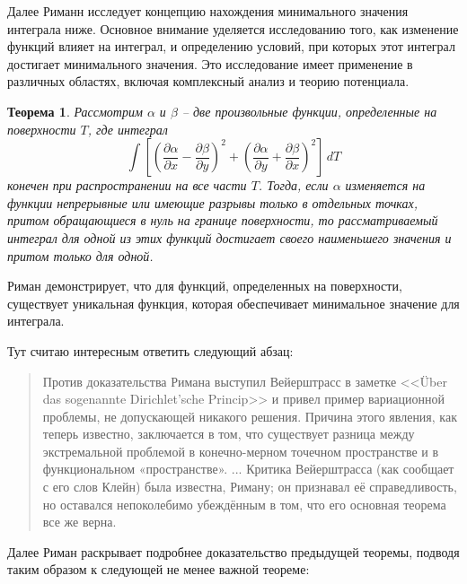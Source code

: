 \documentclass[a4paper,12pt]{article}
\newtheorem*{theorem}{Теорема}
\theoremstyle{remark}
\begin{document}
Далее Риманн исследует концепцию нахождения минимального значения интеграла ниже.
Основное внимание уделяется исследованию того, как изменение
функций влияет на интеграл, и определению условий,
при которых этот интеграл достигает минимального значения.
Это исследование имеет применение в различных
областях, включая комплексный анализ и теорию потенциала.

\begin{theorem}
  Рассмотрим $\alpha$ и $\beta$ -- две произвольные функции, определенные на поверхности \(T\), где интеграл
  \[
    \int
    \left[
      \left( \frac{\partial \alpha}{\partial x} - \frac{\partial \beta}{\partial y} \right)^2 +
      \left( \frac{\partial \alpha}{\partial y} + \frac{\partial \beta}{\partial x} \right)^2
      \right] \, dT
  \]
  конечен при распространении на все части $T$.
  Тогда, если $\alpha$ изменяется на функции непрерывные
  или имеющие разрывы только в отдельных точках, притом
  обращающиеся в нуль на границе поверхности, то рассматриваемый
  интеграл для одной из этих функций достигает своего наименьшего значения
  и притом только для одной.
\end{theorem}

Риман демонстрирует, что для функций, определенных на поверхности, существует уникальная
функция, которая обеспечивает минимальное значение для интеграла.

Тут считаю интересным ответить следующий абзац:
\begin{quotation}
  Против доказательства Римана выступил Вейерштрасс в заметке
  <<Über das sogenannte Dirichlet'sche Princip>> и привел пример
  вариационной проблемы, не допускающей никакого решения.
  Причина этого явления, как теперь известно, заключается в том,
  что существует разница между экстремальной проблемой в конечно-мерном
  точечном пространстве и в функциональном «пространстве». ...
  Критика Вейерштрасса (как сообщает с его слов Клейн) была известна,
  Риману; он признавал её справедливость, но оставался непоколебимо
  убеждённым в том, что его основная теорема все же верна.
\end{quotation}

Далее Риман раскрывает подробнее доказательство предыдущей теоремы,
подводя таким образом к следующей не менее важной теореме:
\end{document}

